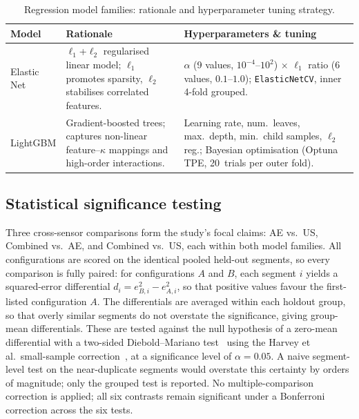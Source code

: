 \begin{table}[htbp]
\centering
\small
\begin{tabular}{@{} l p{4.5cm} p{8.5cm} @{}}
\toprule
\textbf{Model} & \textbf{Rationale} & \textbf{Hyperparameters \& tuning} \\
\midrule
Elastic Net & $\ell_1$+$\ell_2$ regularised linear model; $\ell_1$ promotes sparsity, $\ell_2$ stabilises correlated features. & $\alpha$ (9 values, $10^{-4}$--$10^{2}$) $\times$ $\ell_1$ ratio (6 values, $0.1$--$1.0$); \texttt{ElasticNetCV}, inner 4-fold grouped. \\[4pt]
LightGBM & Gradient-boosted trees; captures non-linear feature--$\kappa$ mappings and high-order interactions. & Learning rate, num.\ leaves, max.\ depth, min.\ child samples, $\ell_2$ reg.; Bayesian optimisation (Optuna TPE, 20~trials per outer fold). \\
\bottomrule
\end{tabular}
\caption{Regression model families: rationale and hyperparameter tuning strategy.}
\label{tab:model_families}
\end{table}

\subsection{Statistical significance testing}
\label{subsec:sig_tests}
Three cross-sensor comparisons form the study's focal claims: AE vs.\ US, Combined vs.\ AE, and Combined vs.\ US, each within both model families. All configurations are scored on the identical pooled held-out segments, so every comparison is fully paired: for configurations $A$ and $B$, each segment $i$ yields a squared-error differential $d_i = e_{B,i}^2 - e_{A,i}^2$, so that positive values favour the first-listed configuration $A$. The differentials are averaged within each holdout group, so that overly similar segments do not overstate the significance, giving \resNgroups{} group-mean differentials. These are tested against the null hypothesis of a zero-mean differential with a two-sided Diebold--Mariano test~\cite{diebold_comparing_1995} using the Harvey et al.\ small-sample correction~\cite{harvey_testing_1997}, at a significance level of $\alpha = 0.05$. A naive segment-level test on the \resNwindowsPooled{} near-duplicate segments would overstate this certainty by orders of magnitude; only the grouped test is reported. No multiple-comparison correction is applied; all six contrasts remain significant under a Bonferroni correction across the six tests.

